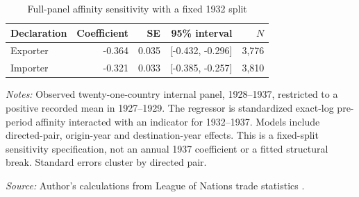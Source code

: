 \begin{table}[!htbp]\centering
\caption{Full-panel affinity sensitivity with a fixed 1932 split}\label{tab:app_full_unbalanced}
\begin{threeparttable}\small\setlength{\tabcolsep}{4pt}
\begin{tabular}{@{}lrrrr@{}}
\toprule
Declaration & Coefficient & SE & 95\% interval & $N$ \\
\midrule
Exporter & -0.364 & 0.035 & [-0.432, -0.296] & 3,776 \\
Importer & -0.321 & 0.033 & [-0.385, -0.257] & 3,810 \\
\bottomrule
\end{tabular}
\begin{tablenotes}[flushleft]\footnotesize\item \textit{Notes:} Observed twenty-one-country internal panel, 1928--1937, restricted to a positive recorded mean in 1927--1929. The regressor is standardized exact-log pre-period affinity interacted with an indicator for 1932--1937. Models include directed-pair, origin-year and destination-year effects. This is a fixed-split sensitivity specification, not an annual 1937 coefficient or a fitted structural break. Standard errors cluster by directed pair.
\item \textit{Source:} Author's calculations from League of Nations trade statistics \parencite{league1930,league1936,league1938}.
\end{tablenotes}\end{threeparttable}\end{table}
